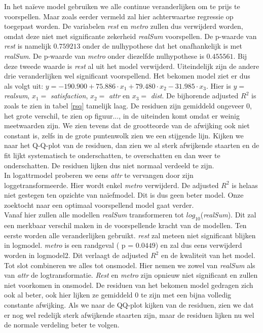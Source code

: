 \documentclass[a4paper]{kulakarticle}
\begin{document}
	In het naïeve model gebruiken we alle continue veranderlijken om te prijs te voorspellen. Maar zoals eerder vermeld zal hier achterwaartse regressie op toegepast worden. De variabelen \textit{rest} en \textit{metro} zullen dus verwijderd worden, omdat deze niet met significante zekerheid \textit{realSum} voorspellen. De p-waarde van \textit{rest} is namelijk $0.759213$ onder de nulhypothese dat het onafhankelijk is met \textit{realSum}. De p-waarde van \textit{metro} onder diezelfde nulhypothese is $0.455561$. Bij deze tweede waarde is \textit{rest} al uit het model verwijderd. Uiteindelijk zijn de andere drie veranderlijken wel significant voorspellend. Het bekomen model ziet er dus als volgt uit: $y = -190.900 + 75.886\cdot x_1 + 79.480\cdot x_2 -31.985\cdot x_3$. Hier is $y =$\textit{realsum}, $x_1 = $ \textit{satisfaction}, $x_2 =$ \textit{attr} en $x_3 =$ \textit{dist}. De bijhorende adjusted $R^2$ is zoals te zien in tabel \ref{rsq} tamelijk laag. De residuen zijn gemiddeld ongeveer 0, het grote verschil, te zien op figuur..., in de uiteinden komt omdat er weinig meetwaarden zijn. We zien tevens dat de grootteorde van de afwijking ook niet constant is, zelfs in de grote puntenwolk zien we een stijgende lijn. Kijken we naar het Q-Q-plot van de residuen, dan zien we al sterk afwijkende staarten en de fit lijkt systematisch te onderschatten, te overschatten en dan weer te onderschatten. De residuen lijken dus niet normaal verdeeld te zijn. \\
	
	In logattrmodel proberen we eens \textit{attr} te vervangen door zijn loggetransformeerde. Hier wordt enkel \textit{metro} verwijderd. De adjusted $R^2$ is helaas niet gestegen ten opzichte van naïefmodel. Dit is dus geen beter model. Onze zoektocht naar een optimaal voorspellend model gaat verder. \\
	
	Vanaf hier zullen alle modellen \textit{realSum} transformeren tot $log_{10}$(\textit{realSum}). Dit zal een merkbaar verschil maken in de voorspellende kracht van de modellen. Ten eerste worden alle veranderlijken gebruikt. \textit{rest} zal meteen niet significant blijken in logmodel. \textit{metro} is een randgeval ( p = $0.0449$) en zal dus eens verwijderd worden in logmodel2. Dit verlaagt de adjusted $R^2$ en de kwaliteit van het model. \\
	
	Tot slot combineren we alles tot onsmodel. Hier nemen we zowel van \textit{realSum} als van \textit{attr} de logtransformatie. \textit{Rest} en \textit{metro} zijn opnieuw niet significant en zullen niet voorkomen in onsmodel. De residuen van het bekomen model gedragen zich ook al beter, ook hier lijken ze gemiddeld 0 te zijn met een bijna volledig constante afwijking. Als we naar de QQ-plot kijken van de residuen, zien we dat er nog wel redelijk sterk afwijkende staarten zijn, maar de residuen lijken nu wel de normale verdeling beter te volgen.  
	
\end{document}
